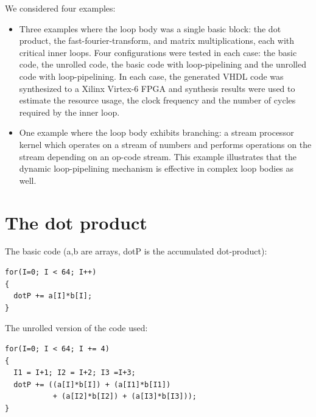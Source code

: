 \documentclass[conference]{IEEEtran}
\begin{document}
We considered four examples:
\begin{itemize}
\item Three examples where the loop body was a single basic block: the dot product, the fast-fourier-transform,
and matrix multiplications, each with critical inner loops.  Four 
configurations were tested in each case: the basic code, the unrolled code,
the basic code with loop-pipelining and the unrolled code with loop-pipelining.
In each case, the generated VHDL code was synthesized to a Xilinx Virtex-6
FPGA and synthesis results were used to estimate the resource usage,
the clock frequency and the number of cycles required by the inner
loop.
\item One example where the loop body exhibits branching: a stream processor kernel which
operates on a stream of numbers and performs operations on the stream depending on
an op-code stream.  This example illustrates that the dynamic loop-pipelining mechanism
is effective in complex loop bodies as well.
\end{itemize}

\section{The dot product}

The basic code (a,b are arrays, dotP is the accumulated dot-product):
\begin{verbatim}
for(I=0; I < 64; I++)
{
  dotP += a[I]*b[I];
}
\end{verbatim}

The unrolled version of the code used:
\begin{verbatim}
for(I=0; I < 64; I += 4)
{
  I1 = I+1; I2 = I+2; I3 =I+3;
  dotP += ((a[I]*b[I]) + (a[I1]*b[I1]) 
           + (a[I2]*b[I2]) + (a[I3]*b[I3]));
}
\end{verbatim}
\end{document}
